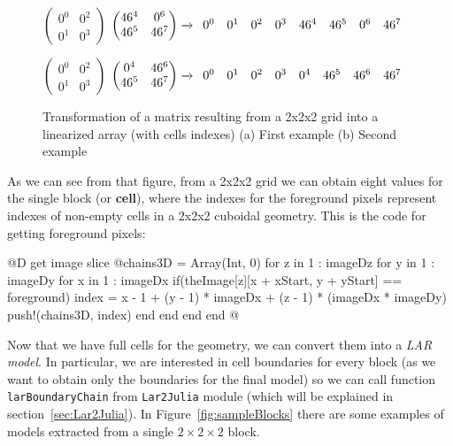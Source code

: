 \documentclass[11pt,oneside]{article}	%
\begin{document}
\begin{figure}[htb] %
   \centering
    $
    \begin{pmatrix}
    0^{0} & 0^{2}\\
    0^{1} & 0^{3}
    \end{pmatrix}
    $
    $
    \begin{pmatrix}
    46^{4} & 0^{6}\\
    46^{5} & 46^{7}
    \end{pmatrix}
    \xrightarrow{}
    \begin{array}{c c c c c c c c}
      0^{0} & 0^{1} & 0^{2} & 0^{3} & 46^{4}  & 46^{5} & 0^{6} & 46^{7} \\
    \end{array}
    $
    
    $
    \begin{pmatrix}
    0^{0} & 0^{2}\\
    0^{1} & 0^{3}
    \end{pmatrix}
    $
    $
   \begin{pmatrix}
    0^{4} & 46^{6}\\
    46^{5} & 46^{7}
    \end{pmatrix}
    \xrightarrow{}
    \begin{array}{c c c c c c c c}
      0^{0} & 0^{1} & 0^{2} & 0^{3} & 0^{4}  & 46^{5} & 46^{6} & 46^{7} \\
    \end{array}
    $
   \hfill
   \caption{Transformation of a matrix resulting from a 2x2x2 grid into a linearized array (with cells indexes) (a) First example (b) Second example}
   \label{fig:linearizedMatrix}
\end{figure}

As we can see from that figure, from a 2x2x2 grid we can obtain eight values for the single block (or \textbf{cell}), where the indexes for the foreground pixels represent indexes of non-empty cells in a 2x2x2 cuboidal geometry.
This is the code for getting foreground pixels:

@D get image slice
@{chains3D = Array(Int, 0)
for z in 1 : imageDz
  for y in 1 : imageDy
    for x in 1 : imageDx
      if(theImage[z][x + xStart, y + yStart] == foreground)
        index = x - 1 + (y - 1) * imageDx + (z - 1) * (imageDx * imageDy)
	push!(chains3D, index)
      end
    end
  end
end @}

Now that we have full cells for the geometry, we can convert them into a \textit{LAR model}. In particular, we are interested in cell boundaries for every block (as we want to obtain only the boundaries for the final model) so we can call function \texttt{larBoundaryChain} from \texttt{Lar2Julia} module (which will be explained in section~\ref{sec:Lar2Julia}). In Figure~\ref{fig:sampleBlocks} there are some examples of models extracted from a single $2 \times 2 \times 2$ block.
\end{document}
